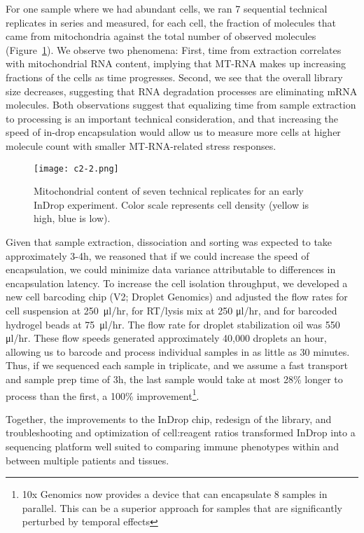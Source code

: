For one sample where we had abundant cells, we ran 7 sequential technical replicates in series and measured, for each cell, the fraction of molecules that came from mitochondria against the total number of observed molecules (Figure~\ref{fig:c2-2}).
We observe two phenomena: First, time from extraction correlates with mitochondrial RNA content, implying that MT-RNA makes up increasing fractions of the cells as time progresses. 
Second, we see that the overall library size decreases, suggesting that RNA degradation processes are eliminating mRNA molecules. 
Both observations suggest that equalizing time from sample extraction to processing is an important technical consideration, and that increasing the speed of in-drop encapsulation would allow us to measure more cells at higher molecule count with smaller MT-RNA-related stress responses. 

\begin{figure} 
\centering
\texttt{[image: c2-2.png]}
  \caption{Mitochondrial content of seven technical replicates for an early InDrop experiment. Color scale represents cell density (yellow is high, blue is low).}
\label{fig:c2-2}
\end{figure}

Given that sample extraction, dissociation and sorting was expected to take approximately 3-4h, we reasoned that if we could increase the speed of encapsulation, we could minimize data variance attributable to differences in encapsulation latency.  
To increase the cell isolation throughput, we developed a new cell barcoding chip (V2; Droplet Genomics) and adjusted the flow rates for cell suspension at 250~μl/hr, for RT/lysis mix at 250 μl/hr, and for barcoded hydrogel beads at 75~μl/hr. 
The flow rate for droplet stabilization oil was 550 μl/hr.
These flow speeds generated approximately 40,000 droplets an hour, allowing us to barcode and process individual samples in as little as 30 minutes.
Thus, if we sequenced each sample in triplicate, and we assume a fast transport and sample prep time of 3h, the last sample would take at most 28\% longer to process than the first, a 100\% improvement\footnote{10x Genomics now provides a device that can encapsulate 8 samples in parallel. This can be a superior approach for samples that are significantly perturbed by temporal effects}. 

Together, the improvements to the InDrop chip, redesign of the library, and troubleshooting and optimization of cell:reagent ratios transformed InDrop into a sequencing platform well suited to comparing immune phenotypes within and between multiple patients and tissues. 

